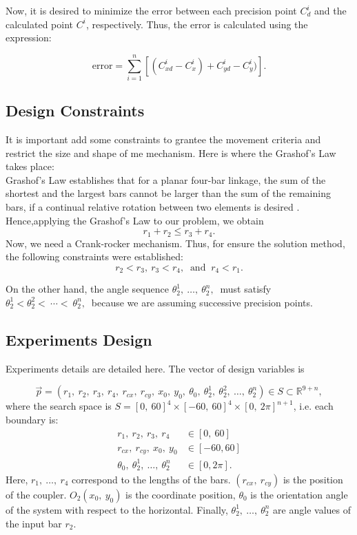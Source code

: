 \documentclass[12pt,letterpape]{article}
\begin{document}
Now, it is desired to minimize the error between each precision point $C^i_d$ and
the calculated point $C^i$, respectively. Thus, the error is calculated using the
expression:

$$
	\text{error} = \sum_{i=1}^n \left[ (C_{xd}^i - C_x^i) + C_{yd}^i - C_y^i) \right]. 
$$

% 
\subsection{Design Constraints} %
\label{sub:design_constraints}
It is important add some constraints to grantee the movement criteria and restrict
the size and shape of me mechanism. Here is where the Grashof's Law takes place:\\

Grashof's Law establishes that for a planar four-bar linkage, the sum of the shortest
and the largest bars cannot be larger than the sum of the remaining bars, if a
continual relative rotation between two elements is desired \cite{david2005}. \\

Hence,applying the Grashof's Law to our problem, we obtain
$$
r_1 + r_2 \leq r_3 + r_4.
$$
% 
Now, we need a Crank-rocker mechanism. Thus, for ensure the solution method, the
following constraints were established:
$$
r_2 < r_3, \ r_3 < r_4, \ \text{ and } \ r_4 < r_1.
$$

On the other hand, the angle sequence $\theta_2^1,\ \ldots,\ \theta_2^n,\ $ must
satisfy $ \theta_2^1 < \theta_2^2 <\ \cdots < \ \theta_2^n,\ $ because we are
assuming successive precision points.

\subsection{Experiments Design} %
\label{sec:experiments_design}

Experiments details are detailed here. The vector of design variables is

\begin{equation}
	\vec{p} = ( r_1,\ r_2,\ r_3,\ r_4,\ r_{cx},\ r_{cy},\ x_0,\ y_0,\ \theta_0,\ \theta_2^1,\ \theta_2^2,\ \ldots,\ \theta_2^n  ) \in S \subset \mathbb{R}^{9+n},
	\label{eqn:desigVars}
\end{equation}
% 
where the search space is $S = [0,\ 60]^4 \times [-60,\ 60]^4 \times [0,\ 2\pi ]^{n+1} $, i.e. each boundary is:
% 
% 
\begin{align*}
       r_1,\ r_2,\ r_3,\ r_4 & \in [0,\ 60]\\
 r_{cx},\ r_{cy},\ x_0,\ y_0 & \in [-60, 60]\\	
\theta_0,\ \theta_2^1,\ \ldots,\ \theta_2^n &\in [0, 2\pi].
\end{align*}
% 
Here, $r_1,\ \ldots,\ r_4$ correspond to the lengths of the bars. $(r_{cx},\ r_{cy})$
is the position of the coupler. $O_2(x_0,\ y_0)$ is the coordinate position,
$\theta_0$ is the orientation angle of the system with respect to the horizontal.
Finally, $\theta_2^1,\ \ldots,\ \theta_2^n$ are angle values of the input bar $r_2$.\\
% 
\end{document}
